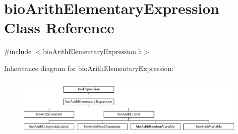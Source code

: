 \hypertarget{classbio_arith_elementary_expression}{}\section{bio\+Arith\+Elementary\+Expression Class Reference}
\label{classbio_arith_elementary_expression}


{\ttfamily \#include $<$bio\+Arith\+Elementary\+Expression.\+h$>$}

Inheritance diagram for bio\+Arith\+Elementary\+Expression\+:\begin{figure}[H]
\begin{center}
\leavevmode
\includegraphics[height=2.962963cm]{classbio_arith_elementary_expression}
\end{center}
\end{figure}
